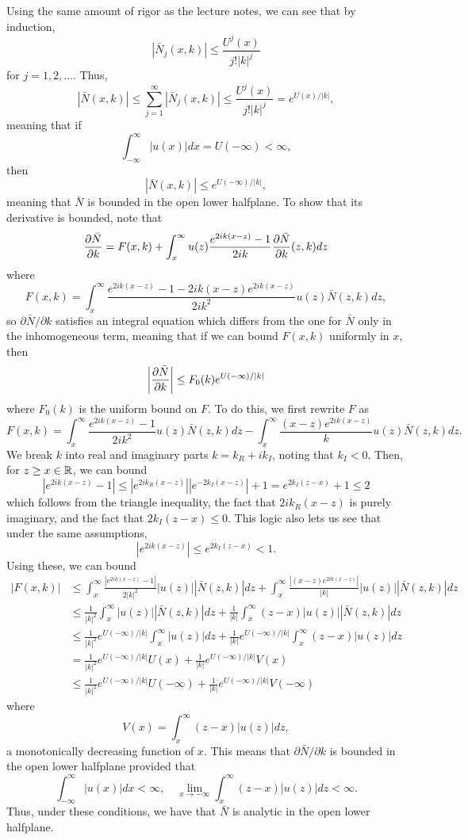 \documentclass{article}
\begin{document}
Using the same amount of rigor as the lecture notes, we can see that by induction, 
\[
|\bar N_j(x,k)|\leq\frac{U^j(x)}{j!|k|^j}
\] 	
for $j=1,2,\ldots$. Thus,
\[
|\bar N(x,k)|\leq\sum_{j=1}^{\infty}|\bar N_j(x,k)|\leq \frac{U^j(x)}{j!|k|^j}=e^{U(x)/|k|},
\]
meaning that if
\[
\int_{-\infty}^{\infty}|u(x)|dx=U(-\infty)<\infty,
\]
then 
\[
|\bar N(x,k)|\leq e^{U(-\infty)/|k|},
\]
meaning that $\bar N$ is bounded in the open lower halfplane. To show that its derivative is bounded, note that
\[
\frac{\partial \bar N}{\partial k}=F(x,k)+\int_{x}^{\infty}u(z)\frac{e^{2ik(x-z)}-1}{2ik}\frac{\partial \bar{N}}{\partial k}(z,k)dz
\]
where
\[
F(x,k)=\int_{x}^{\infty}\frac{e^{2ik(x-z)}-1-2ik(x-z)e^{2ik(x-z)}}{2ik^2}u(z)\bar N(z,k)dz,	
\]
so $\partial\bar N/\partial k $ satisfies an integral equation which differs from the one for $\bar N$ only in the inhomogeneous term, meaning that if we can bound $F(x,k)$ uniformly in $x$, then
\[
\left|\frac{\partial \bar N}{\partial k}\right|\leq F_0(k)e^{U(-\infty)/|k|}
\]
where $F_0(k)$ is the uniform bound on $F$. To do this, we first rewrite $F$ as
\[
F(x,k)=\int_{x}^{\infty}\frac{e^{2ik(x-z)}-1}{2ik^2}u(z)\bar N(z,k)dz-\int_{x}^{\infty}\frac{(x-z)e^{2ik(x-z)}}{k}u(z)\bar N(z,k)dz.
\]
We break $k$ into real and imaginary parts $k=k_R+ik_I$, noting that $k_I<0$. Then, for $z\geq x\in\mathbb{R}$, we can bound
\[
|e^{2ik(x-z)}-1|\leq|e^{2ik_R(x-z)}||e^{-2k_I(x-z)}|+1=e^{2k_I(z-x)}+1\leq2
\]
which follows from the triangle inequality, the fact that $2ik_R(x-z)$ is purely imaginary, and the fact that $2k_I(z-x)\leq0$. This logic also lets us see that under the same assumptions,
\[
|e^{2ik(x-z)}|\leq e^{2k_I(z-x)}<1.
\]
Using these, we can bound
\begin{align*}
|F(x,k)|&\leq\int_{x}^{\infty}\frac{|e^{2ik(x-z)}-1|}{2|k|^2}|u(z)||\bar N(z,k)|dz+\int_{x}^{\infty}\frac{|(x-z)e^{2ik(x-z)}|}{|k|}|u(z)||\bar N(z,k)|dz\\&\leq
\frac{1}{|k|^2}\int_{x}^{\infty}|u(z)||\bar N(z,k)|dz+\frac{1}{|k|}\int_{x}^{\infty}(z-x)|u(z)||\bar N(z,k)|dz\\&\leq
\frac{1}{|k|^2}e^{U(-\infty)/|k|}\int_{x}^{\infty}|u(z)|dz+\frac{1}{|k|}e^{U(-\infty)/|k|}\int_{x}^{\infty}(z-x)|u(z)|dz\\&=
\frac{1}{|k|^2}e^{U(-\infty)/|k|}U(x)+\frac{1}{|k|}e^{U(-\infty)/|k|}V(x)\\&\leq
\frac{1}{|k|^2}e^{U(-\infty)/|k|}U(-\infty)+\frac{1}{|k|}e^{U(-\infty)/|k|}V(-\infty)
\end{align*}
where
\[
V(x)=\int_{x}^{\infty}(z-x)|u(z)|dz,
\]
a monotonically decreasing function of $x$. This means that $\partial\bar N/\partial k $ is bounded in the open lower halfplane provided that
\[
\int_{-\infty}^{\infty}|u(x)|dx<\infty,\quad \lim_{x\to-\infty}\int_{x}^{\infty}(z-x)|u(z)|dz<\infty.
\]
Thus, under these conditions, we have that $\bar N$ is analytic in the open lower halfplane.
\end{document}
